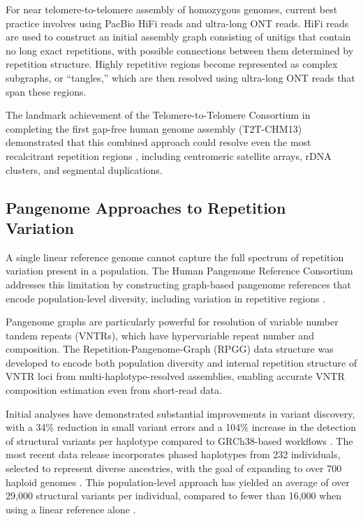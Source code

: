 For near telomere-to-telomere assembly of homozygous genomes, current best practice involves using PacBio HiFi reads and ultra-long ONT reads. HiFi reads are used to construct an initial assembly graph consisting of unitigs that contain no long exact repetitions, with possible connections between them determined by repetition structure. Highly repetitive regions become represented as complex subgraphs, or ``tangles,'' which are then resolved using ultra-long ONT reads that span these regions.

The landmark achievement of the Telomere-to-Telomere Consortium in completing the first gap-free human genome assembly (T2T-CHM13) demonstrated that this combined approach could resolve even the most recalcitrant repetition regions \parencite{rhie2021b,nurk2022}, including centromeric satellite arrays, rDNA clusters, and segmental duplications.

\subsection{Pangenome Approaches to Repetition Variation}

A single linear reference genome cannot capture the full spectrum of repetition variation present in a population. The Human Pangenome Reference Consortium \parencite{wang2022} addresses this limitation by constructing graph-based pangenome references that encode population-level diversity, including variation in repetitive regions \parencite{liao2023}.

Pangenome graphs are particularly powerful for resolution of variable number tandem repeats (VNTRs), which have hypervariable repeat number and composition. The Repetition-Pangenome-Graph (RPGG) data structure was developed to encode both population diversity and internal repetition structure of VNTR loci from multi-haplotype-resolved assemblies, enabling accurate VNTR composition estimation even from short-read data.

Initial analyses have demonstrated substantial improvements in variant discovery, with a 34\% reduction in small variant errors and a 104\% increase in the detection of structural variants per haplotype compared to GRCh38-based workflows \parencite{liao2023}. The most recent data release incorporates phased haplotypes from 232 individuals, selected to represent diverse ancestries, with the goal of expanding to over 700 haploid genomes \parencite{wang2022}. This population-level approach has yielded an average of over 29,000 structural variants per individual, compared to fewer than 16,000 when using a linear reference alone \parencite{groza2024}.


